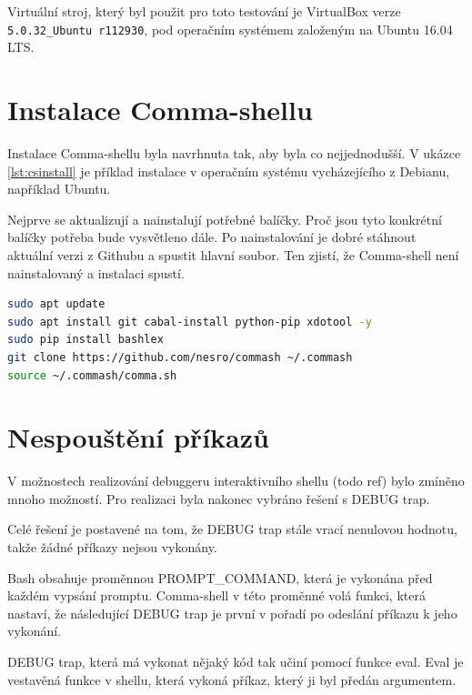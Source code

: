\documentclass[thesis=M,czech]{FITthesis}[2012/06/26]
\begin{document}
Virtuální stroj, který byl použit pro toto testování je VirtualBox verze \texttt{5.0.32\_Ubuntu r112930}, pod operačním systémem založeným na Ubuntu 16.04 LTS.



\section{Instalace Comma-shellu}

Instalace Comma-shellu byla navrhnuta tak, aby byla co nejjednodušší. V ukázce \ref{lst:csinstall} je příklad instalace v operačním systému vycházejícího z Debianu, například Ubuntu.

Nejprve se aktualizují a nainstalují potřebné balíčky. Proč jsou tyto konkrétní balíčky potřeba bude vysvětleno dále. Po nainstalování je dobré stáhnout aktuální verzi z Githubu a spustit hlavní soubor. Ten zjistí, že Comma-shell není nainstalovaný a instalaci spustí.

\begin{minipage}{\linewidth}
\begin{lstlisting}[language=bash, caption={Instalace Comma-shellu}, label={lst:csinstall}]
sudo apt update
sudo apt install git cabal-install python-pip xdotool -y
sudo pip install bashlex
git clone https://github.com/nesro/commash ~/.commash
source ~/.commash/comma.sh
\end{lstlisting}
\end{minipage}



%
%
%
%
%
\section{Nespouštění příkazů}\label{sec:debugtraprealization}
V možnostech realizování debuggeru interaktivního shellu (todo ref) bylo zmíněno mnoho možností. Pro realizaci byla nakonec vybráno řešení s DEBUG trap.

Celé řešení je postavené na tom, že DEBUG trap stále vrací nenulovou hodnotu, takže žádné příkazy nejsou vykonány.

Bash obsahuje proměnnou PROMPT\_COMMAND, která je vykonána před každém vypsání promptu. Comma-shell v této proměnné volá funkci, která nastaví, že následující DEBUG trap je první v pořadí po odeslání příkazu k jeho vykonání.

DEBUG trap, která má vykonat nějaký kód tak učiní pomocí funkce eval. Eval je vestavěná funkce v shellu, která vykoná příkaz, který ji byl předán argumentem.
\end{document}
